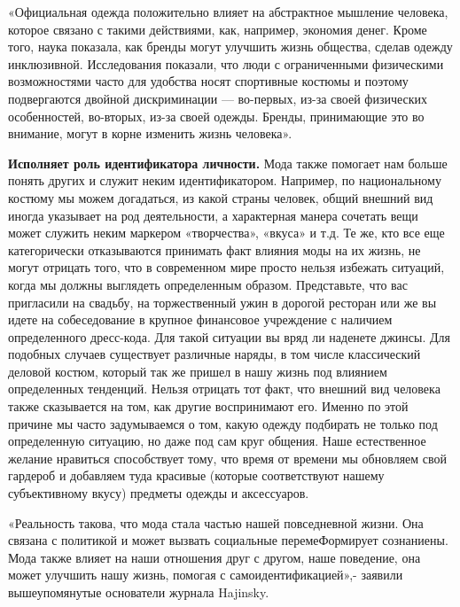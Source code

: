 \begin{fancyquotes}
    «Официальная одежда положительно влияет на абстрактное мышление человека, которое связано с такими действиями, как, например, экономия денег. Кроме того, наука показала, как бренды могут улучшить жизнь общества, сделав одежду инклюзивной. Исследования показали, что люди с ограниченными физическими возможностями часто для удобства носят спортивные костюмы и поэтому подвергаются двойной дискриминации — во-первых, из-за своей физических особенностей, во-вторых, из-за своей одежды. Бренды, принимающие это во внимание, могут в корне изменить жизнь человека».
\end{fancyquotes}

\textbf{Исполняет роль идентификатора личности.}
Мода также помогает нам больше понять других и служит неким идентификатором. Например, по национальному костюму мы можем догадаться, из какой страны человек, общий внешний вид иногда указывает на род деятельности, а характерная манера сочетать вещи может служить неким маркером «творчества», «вкуса» и т.д. Те же, кто все еще категорически отказываются принимать факт влияния моды на их жизнь, не могут отрицать того, что в современном мире просто нельзя избежать ситуаций, когда мы должны выглядеть определенным образом. Представьте, что вас пригласили на свадьбу, на торжественный ужин в дорогой ресторан или же вы идете на собеседование в крупное финансовое учреждение с наличием определенного дресс-кода. Для такой ситуации вы вряд ли наденете джинсы. Для подобных случаев существует различные наряды, в том числе классический деловой костюм, который так же пришел в нашу жизнь под влиянием определенных тенденций. Нельзя отрицать тот факт, что внешний вид человека также сказывается на том, как другие воспринимают его. Именно по этой причине мы часто задумываемся о том, какую одежду подбирать не только под определенную ситуацию, но даже под сам круг общения. Наше естественное желание нравиться способствует тому, что время от времени мы обновляем свой гардероб и добавляем туда красивые (которые соответствуют нашему субъективному вкусу) предметы одежды и аксессуаров.

\begin{fancyquotes}
    «Реальность такова, что мода стала частью нашей повседневной жизни. Она связана с политикой и может вызвать социальные перемеФормирует сознаниены. Мода также влияет на наши отношения друг с другом, наше поведение, она может улучшить нашу жизнь, помогая с самоидентификацией»,- заявили вышеупомянутые основатели журнала Hajinsky.
\end{fancyquotes}

